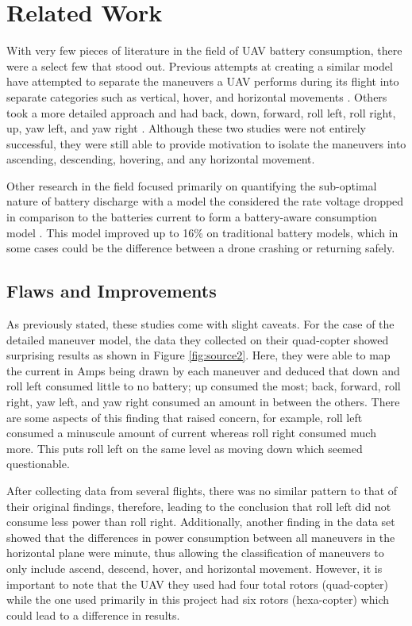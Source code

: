 \documentclass{article}
\begin{document}
\section{Related Work}
With very few pieces of literature in the field of UAV battery consumption, there were a select few that stood out. Previous attempts at creating a similar model have attempted to separate the maneuvers a UAV performs during its flight into separate categories such as vertical, hover, and horizontal movements \cite{Prasetia}. Others took a more detailed approach and had back, down, forward, roll left, roll right, up, yaw left, and yaw right \cite{Corral}. Although these two studies were not entirely successful, they were still able to provide motivation to isolate the maneuvers into ascending, descending, hovering, and any horizontal movement.\par

Other research in the field focused primarily on quantifying the sub-optimal nature of battery discharge with a model the considered the rate voltage dropped in comparison to the batteries current to form a battery-aware consumption model \cite{Chen}. This model improved up to 16\% on traditional battery models, which in some cases could be the difference between a drone crashing or returning safely.\par

\subsection{Flaws and Improvements}

As previously stated, these studies come with slight caveats. For the case of the detailed maneuver model, the data they collected on their quad-copter showed surprising results as shown in Figure \ref{fig:source2}. Here, they were able to map the current in Amps being drawn by each maneuver and deduced that down and roll left consumed little to no battery; up consumed the most; back, forward, roll right, yaw left, and yaw right consumed an amount in between the others. There are some aspects of this finding that raised concern, for example, roll left consumed a minuscule amount of current whereas roll right consumed much more. This puts roll left on the same level as moving down which seemed questionable. \par

After collecting data from several flights, there was no similar pattern to that of their original findings, therefore, leading to the conclusion that roll left did not consume less power than roll right. Additionally, another finding in the data set showed that the differences in power consumption between all maneuvers in the horizontal plane were minute, thus allowing the classification of maneuvers to only include ascend, descend, hover, and horizontal movement. However, it is important to note that the UAV they used had four total rotors (quad-copter) while the one used primarily in this project had six rotors (hexa-copter) which could lead to a difference in results.
\end{document}
